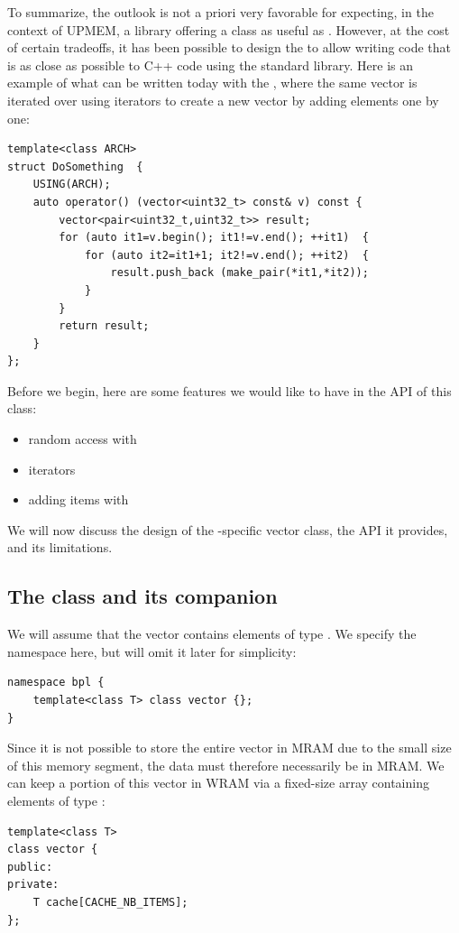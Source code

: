 To summarize, the outlook is not a priori very favorable for expecting, in the context of UPMEM, 
a library offering a class as useful as . However, at the cost of certain tradeoffs, 
it has been possible to design the \BPL to allow writing code that is as close as possible to C++ code using the standard library. 
Here is an example of what can be written today with the \BPL, where the same vector is iterated over using iterators 
to create a new vector by adding elements one by one:
\begin{verbatim}
template<class ARCH>
struct DoSomething  {
    USING(ARCH);
    auto operator() (vector<uint32_t> const& v) const {
        vector<pair<uint32_t,uint32_t>> result;
        for (auto it1=v.begin(); it1!=v.end(); ++it1)  {
            for (auto it2=it1+1; it2!=v.end(); ++it2)  {
                result.push_back (make_pair(*it1,*it2));
            }
        }
        return result;
    }
};
\end{verbatim}

Before we begin, here are some features we would like to have in the API of this  class:
\begin{itemize}
	\item random access with  
	\item iterators
	\item adding items with  
\end{itemize}

We will now discuss the design of the \BPL-specific vector class, the API it provides, and its limitations.
  
\subsection{The  class and its companion }

We will assume that the vector contains elements of type . 
We specify the  namespace here, but will omit it later for simplicity:
\begin{verbatim}
namespace bpl {
	template<class T> class vector {};
}
\end{verbatim}

Since it is not possible to store the entire vector in MRAM due to the small size of this memory segment, 
the data must therefore necessarily be in MRAM. 
We can keep a portion of this vector in WRAM via a fixed-size array containing  elements of type :
\begin{verbatim}
template<class T> 
class vector {
public:
private:
    T cache[CACHE_NB_ITEMS];	
};
\end{verbatim}

